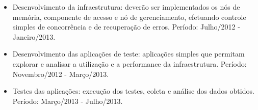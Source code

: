 \documentclass[11pt,twoside,a4paper]{book}
\renewcommand{\chaptermark}[1]{\markboth{\MakeUppercase{#1}}{}}
\begin{document}
\begin{itemize}
\item Desenvolvimento da infraestrutura: deverão ser implementados os nós de memória, componente de acesso e nó de gerenciamento, efetuando controle simples de concorrência e de recuperação de erros. Período: Julho/2012 - Janeiro/2013.
\item Desenvolvimento das aplicações de teste: aplicações simples que permitam explorar e analisar a utilização e a performance da infraestrutura. Período: Novembro/2012 - Março/2013.
\item Testes das aplicações: execução dos testes, coleta e análise dos dados obtidos. Período: Março/2013 - Julho/2013.
\end{itemize}

\renewcommand{\chaptermark}[1]{\markboth{\MakeUppercase{\appendixname\ \thechapter}} {\MakeUppercase{#1}} }
\fancyhead[RE,LO]{}
\appendix

\backmatter \singlespacing   %
\end{document}
